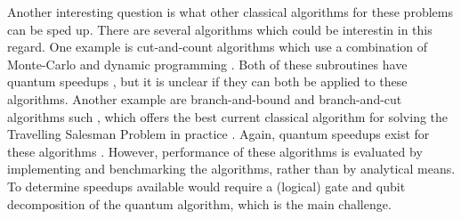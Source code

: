 Another interesting question is what other classical algorithms for these problems can be sped up. There are several algorithms which could be interestin in this regard. One example is cut-and-count algorithms which use a combination of Monte-Carlo and dynamic programming \cite{bjorklund14,bodlaender15,cygan11}. Both of these subroutines have quantum speedups \cite{montanaro2015mc, ronagh2019}, but it is unclear if they can both be applied to these algorithms. Another example are branch-and-bound and branch-and-cut algorithms such \cite{little1963, padberg1991}, which offers the best current classical algorithm for solving the Travelling Salesman Problem in practice \cite{applegate2006}. Again, quantum speedups exist for these algorithms \cite{montanaro2019}. However, performance of these algorithms is evaluated by implementing and benchmarking the algorithms, rather than by analytical means. To determine speedups available would require a (logical) gate and qubit decomposition of the quantum algorithm, which is the main challenge.
